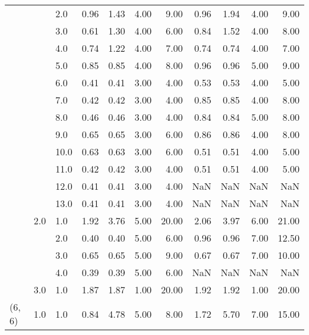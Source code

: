 \begin{tabular}{lllrrrrrrrr}
       &     & 2.0  &       0.96 &      1.43 & 4.00 &   9.00 &       0.96 &      1.94 & 4.00 &   9.00 \\
       &     & 3.0  &       0.61 &      1.30 & 4.00 &   6.00 &       0.84 &      1.52 & 4.00 &   8.00 \\
       &     & 4.0  &       0.74 &      1.22 & 4.00 &   7.00 &       0.74 &      0.74 & 4.00 &   7.00 \\
       &     & 5.0  &       0.85 &      0.85 & 4.00 &   8.00 &       0.96 &      0.96 & 5.00 &   9.00 \\
       &     & 6.0  &       0.41 &      0.41 & 3.00 &   4.00 &       0.53 &      0.53 & 4.00 &   5.00 \\
       &     & 7.0  &       0.42 &      0.42 & 3.00 &   4.00 &       0.85 &      0.85 & 4.00 &   8.00 \\
       &     & 8.0  &       0.46 &      0.46 & 3.00 &   4.00 &       0.84 &      0.84 & 5.00 &   8.00 \\
       &     & 9.0  &       0.65 &      0.65 & 3.00 &   6.00 &       0.86 &      0.86 & 4.00 &   8.00 \\
       &     & 10.0 &       0.63 &      0.63 & 3.00 &   6.00 &       0.51 &      0.51 & 4.00 &   5.00 \\
       &     & 11.0 &       0.42 &      0.42 & 3.00 &   4.00 &       0.51 &      0.51 & 4.00 &   5.00 \\
       &     & 12.0 &       0.41 &      0.41 & 3.00 &   4.00 &        NaN &       NaN &  NaN &    NaN \\
       &     & 13.0 &       0.41 &      0.41 & 3.00 &   4.00 &        NaN &       NaN &  NaN &    NaN \\
       & 2.0 & 1.0  &       1.92 &      3.76 & 5.00 &  20.00 &       2.06 &      3.97 & 6.00 &  21.00 \\
       &     & 2.0  &       0.40 &      0.40 & 5.00 &   6.00 &       0.96 &      0.96 & 7.00 &  12.50 \\
       &     & 3.0  &       0.65 &      0.65 & 5.00 &   9.00 &       0.67 &      0.67 & 7.00 &  10.00 \\
       &     & 4.0  &       0.39 &      0.39 & 5.00 &   6.00 &        NaN &       NaN &  NaN &    NaN \\
       & 3.0 & 1.0  &       1.87 &      1.87 & 1.00 &  20.00 &       1.92 &      1.92 & 1.00 &  20.00 \\
(6, 6) & 1.0 & 1.0  &       0.84 &      4.78 & 5.00 &   8.00 &       1.72 &      5.70 & 7.00 &  15.00 \\

\end{tabular}
